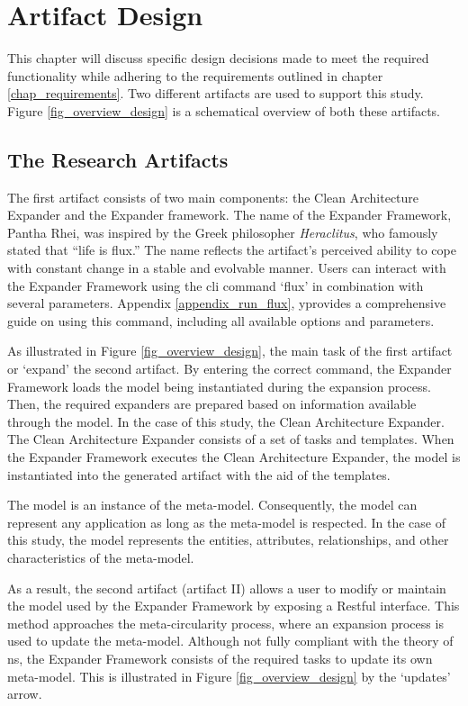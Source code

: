 \chapter{Artifact Design} \label{chap_designing_artifacts}

This chapter will discuss specific design decisions made to meet the required
functionality while adhering to the requirements outlined in chapter
\ref{chap_requirements}. Two different artifacts are used to support this study. Figure
\ref{fig_overview_design} is a schematical overview of both these artifacts.

\section{The Research Artifacts}
The first artifact consists of two main components: the Clean Architecture Expander and
the Expander framework. The name of the Expander Framework, Pantha Rhei, was inspired by
the Greek philosopher \emph{Heraclitus}, who famously stated that \enquote{life is flux.}
The name reflects the artifact's perceived ability to cope with constant change in a
stable and evolvable manner. Users can interact with the Expander Framework using the
\gls{cli} command \enquote*{flux} in combination with several parameters. Appendix
\ref{appendix_run_flux}, yprovides a comprehensive guide on using this command, including
all available options and parameters.

As illustrated in Figure \ref{fig_overview_design}, the main task of the first artifact or
\enquote*{expand} the second artifact. By entering the correct command, the Expander
Framework loads the model being instantiated during the expansion process. Then, the
required expanders are prepared based on information available through the model. In the
case of this study, the Clean Architecture Expander. The Clean Architecture Expander
consists of a set of tasks and templates. When the Expander Framework executes the Clean
Architecture Expander, the model is instantiated into the generated artifact with the aid
of the templates.

The model is an instance of the meta-model. Consequently, the model can represent any
application as long as the meta-model is respected. In the case of this study, the model
represents the entities, attributes, relationships, and other characteristics of the
meta-model.

As a result, the second artifact (artifact II) allows a user to modify or maintain the
model used by the Expander Framework by exposing a Restful interface. This method
approaches the meta-circularity process, where an expansion process is used to update the
meta-model. Although not fully compliant with the theory of \gls{ns}, the Expander
Framework consists of the required tasks to update its own meta-model. This is illustrated
in Figure \ref{fig_overview_design} by the \enquote*{updates} arrow.

